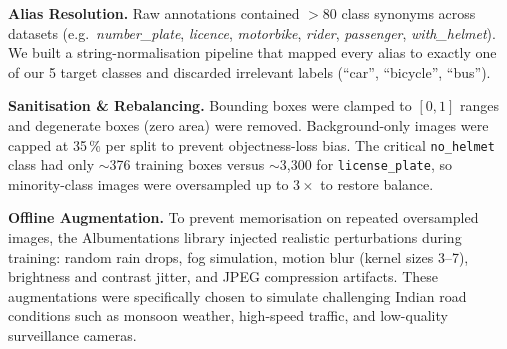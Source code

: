 \documentclass[10pt,a4paper,twocolumn]{article}
\begin{document}
\begin{table}[H]
\centering
\setlength{\tabcolsep}{4pt}
\caption{Dataset aggregation summary after trimming and sanitisation.}
\end{table}

\textbf{Alias Resolution.} Raw annotations contained $>$80 class synonyms across datasets (e.g.\ \textit{number\_plate}, \textit{licence}, \textit{motorbike}, \textit{rider}, \textit{passenger}, \textit{with\_helmet}). We built a string-normalisation pipeline that mapped every alias to exactly one of our 5 target classes and discarded irrelevant labels (``car'', ``bicycle'', ``bus'').

\textbf{Sanitisation \& Rebalancing.} Bounding boxes were clamped to $[0,1]$ ranges and degenerate boxes (zero area) were removed. Background-only images were capped at 35\,\% per split to prevent objectness-loss bias. The critical \texttt{no\_helmet} class had only $\sim$376 training boxes versus $\sim$3{,}300 for \texttt{license\_plate}, so minority-class images were oversampled up to $3\times$ to restore balance.

\textbf{Offline Augmentation.} To prevent memorisation on repeated oversampled images, the Albumentations library injected realistic perturbations during training: random rain drops, fog simulation, motion blur (kernel sizes 3–7), brightness and contrast jitter, and JPEG compression artifacts. These augmentations were specifically chosen to simulate challenging Indian road conditions such as monsoon weather, high-speed traffic, and low-quality surveillance cameras.
\end{document}
